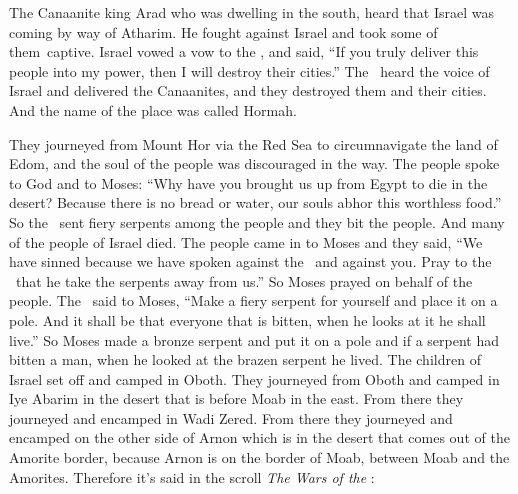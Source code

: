 
\begin{inparaenum}
   The Canaanite king Arad who was dwelling in the south, heard that Israel was coming by way of Atharim. He fought against Israel and took some of them\understood\ captive.%
   Israel vowed a vow to the \lord, and said, ``If you truly deliver this people into my power, then I will destroy their cities.''%
   The \lord\ heard the voice of Israel and delivered the Canaanites, and they destroyed them and their cities. And the name of the place was called Hormah.%
  
   They journeyed from Mount Hor via the Red Sea to circumnavigate the land of Edom, and the soul of the people was discouraged in the way.%
   The people spoke to God and to Moses: ``Why have you brought us up from Egypt to die in the desert? Because there is no bread or water, our souls abhor this worthless food.''%
   So the \lord\ sent fiery serpents among the people and they bit the people. And many of the people of Israel died.%
   The people came in to Moses and they said, ``We have sinned because we have spoken against the \lord\ and against you. Pray to the \lord\ that he take the serpents away from us.'' So Moses prayed on behalf of the people.%
   The \lord\ said to Moses, ``Make a fiery serpent for yourself and place it on a pole. And it shall be that everyone that is bitten, when he looks at it he shall live.''%
   So Moses made a bronze serpent and put it on a pole and if a serpent had bitten a man, when he looked at the brazen serpent he lived.%
   The children of Israel set off and camped in Oboth.%
   They journeyed from Oboth and camped in Iye Abarim in the desert that is before Moab in the east.%
   From there they journeyed and encamped in Wadi Zered.%
   From there they journeyed and encamped on the other side of Arnon which is in the desert that comes out of the Amorite border, because Arnon is on the border of Moab, between Moab and the Amorites.%
   Therefore it's said in the scroll \textit{The Wars of the \lord}:\smallskip%
  

\end{inparaenum}
